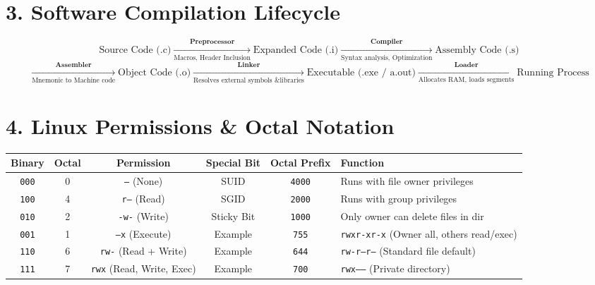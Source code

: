 \vspace{3mm}

\section*{3. Software Compilation Lifecycle}
$$\text{Source Code (.c)} \xrightarrow[\text{Macros, Header Inclusion}]{\textbf{Preprocessor}} \text{Expanded Code (.i)} \xrightarrow[\text{Syntax analysis, Optimization}]{\textbf{Compiler}} \text{Assembly Code (.s)}$$
$$\xrightarrow[\text{Mnemonic to Machine code}]{\textbf{Assembler}} \text{Object Code (.o)} \xrightarrow[\text{Resolves external symbols \& libraries}]{\textbf{Linker}} \text{Executable (.exe / a.out)} \xrightarrow[\text{Allocates RAM, loads segments}]{\textbf{Loader}} \text{Running Process}$$

\vspace{3mm}

\section*{4. Linux Permissions \& Octal Notation}
\begin{center}
\small
\begin{tabular}{|c|c|c||c|c|l|}
\hline
\textbf{Binary} & \textbf{Octal} & \textbf{Permission} & \textbf{Special Bit} & \textbf{Octal Prefix} & \textbf{Function} \\
\hline
\texttt{000} & 0 & \texttt{---} (None) & SUID & \texttt{4000} & Runs with file owner privileges \\
\texttt{100} & 4 & \texttt{r--} (Read) & SGID & \texttt{2000} & Runs with group privileges \\
\texttt{010} & 2 & \texttt{-w-} (Write) & Sticky Bit & \texttt{1000} & Only owner can delete files in dir \\
\texttt{001} & 1 & \texttt{--x} (Execute) & Example & \texttt{755} & \texttt{rwxr-xr-x} (Owner all, others read/exec) \\
\texttt{110} & 6 & \texttt{rw-} (Read + Write) & Example & \texttt{644} & \texttt{rw-r--r--} (Standard file default) \\
\texttt{111} & 7 & \texttt{rwx} (Read, Write, Exec) & Example & \texttt{700} & \texttt{rwx------} (Private directory) \\
\hline
\end{tabular}
\end{center}

\vspace{3mm}

